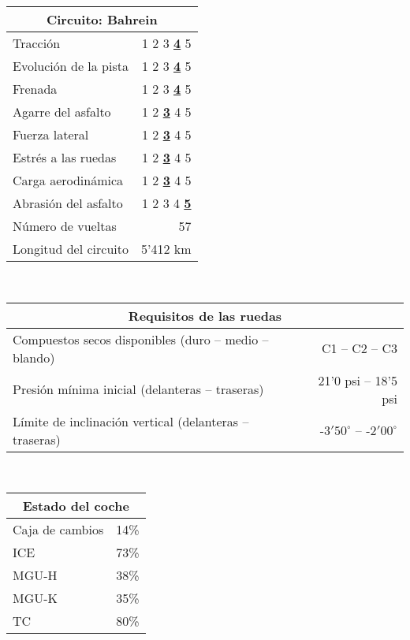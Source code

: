 \documentclass[12pt,a4paper,twoside,spanish]{article}      %
\begin{document}
\begin{table}[H]
    \centering
    \begin{tabular}{lr}
        \toprule
        \multicolumn{2}{c}{Circuito: \textbf{Bahrein}} \\ \midrule
        Tracción & 1 2 3 \underline{\textbf{4}} 5 \\
        Evolución de la pista & 1 2 3 \underline{\textbf{4}} 5 \\
        Frenada & 1 2 3 \underline{\textbf{4}} 5 \\
        Agarre del asfalto & 1 2 \underline{\textbf{3}} 4 5 \\
        Fuerza lateral & 1 2 \underline{\textbf{3}} 4 5 \\
        Estrés a las ruedas & 1 2 \underline{\textbf{3}} 4 5 \\
        Carga aerodinámica & 1 2 \underline{\textbf{3}} 4 5 \\
        Abrasión del asfalto & 1 2 3 4 \underline{\textbf{5}} \\
        Número de vueltas & 57 \\
        Longitud del circuito & 5'412 km \\ \bottomrule
    \end{tabular} \\ \vspace{1em}
    \begin{tabular}{lr}
        \toprule
        \multicolumn{2}{c}{\textbf{Requisitos de las ruedas}} \\ \midrule
        Compuestos secos disponibles (duro -- medio -- blando) & C1 -- C2 -- C3 \\
        Presión mínima inicial (delanteras -- traseras) & 21'0 psi -- 18'5 psi \\
        Límite de inclinación vertical (delanteras -- traseras) & -$3'50^\circ$ -- -$2'00^\circ$ \\ \bottomrule
    \end{tabular} \\ \vspace{1em}
    \begin{tabular}{lr}
        \toprule
        \multicolumn{2}{c}{\textbf{Estado del coche}} \\ \midrule
        Caja de cambios & 14\% \\
        ICE & 73\% \\
        MGU-H & 38\% \\
        MGU-K & 35\% \\
        TC & 80\% \\

\end{tabular}
\end{table}
\end{document}

